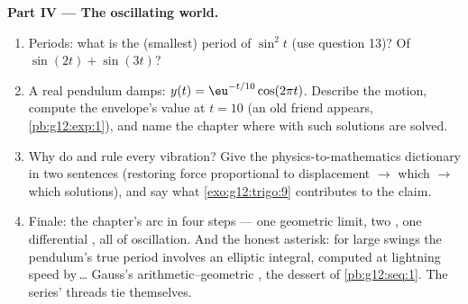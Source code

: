 \begin{problem}
\medskip
\noindent\textbf{Part IV --- The oscillating world.}
\begin{enumerate}[resume]
  \item Periods: what is the (smallest) period of
        $\sin^2 t$ (use question 13)? Of
        $\sin(2t) + \sin(3t)$?
  \item A real pendulum damps:
        $y(t) = \eu^{-t/10}\cos(2\pi t)$. Describe the motion,
        compute the envelope's value at $t = 10$ (an old friend
        appears, \cref{pb:g12:exp:1}), and name the chapter
        where  with such solutions are solved.
  \item Why do  and  rule every vibration? Give the
        physics-to-mathematics dictionary in two sentences
        (restoring force proportional to displacement
        $\rightarrow$ which  $\rightarrow$ which
        solutions), and say what \cref{exo:g12:trigo:9}
        contributes to the claim.
  \item Finale: the chapter's arc in four steps --- one
        geometric limit, two , one differential
        , all of oscillation. And the honest asterisk:
        for large swings the pendulum's true period involves an
        elliptic integral, computed at lightning speed by\,\dots
        Gauss's arithmetic--geometric , the dessert of
        \cref{pb:g12:seq:1}. The series' threads tie themselves.
\end{enumerate}
\end{problem}
